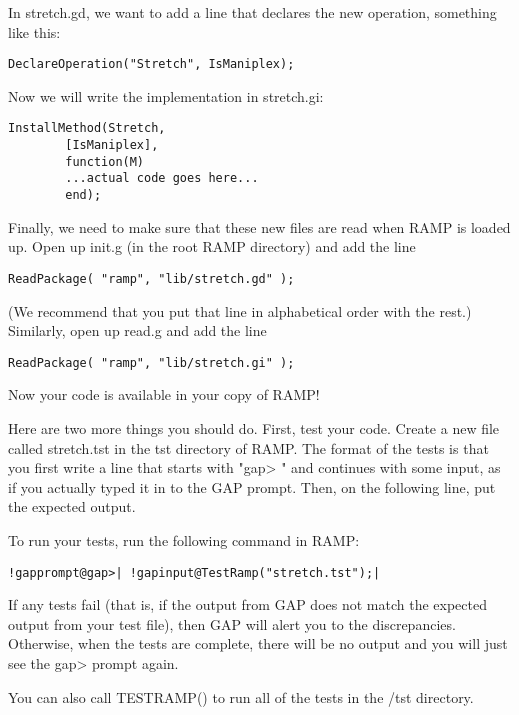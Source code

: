 \documentclass[a4paper,11pt]{report}
\begin{document}
{{ In stretch.gd, we want to add a line that declares the new operation,
something like this: 
\begin{Verbatim}[commandchars=!@|,fontsize=\small,frame=single,label=Example]
  DeclareOperation("Stretch", IsManiplex);
\end{Verbatim}
 Now we will write the implementation in stretch.gi: 
\begin{Verbatim}[commandchars=!@|,fontsize=\small,frame=single,label=Example]
  InstallMethod(Stretch, 
  		[IsManiplex],
  		function(M)
  		...actual code goes here...
  		end);
\end{Verbatim}
 Finally, we need to make sure that these new files are read when RAMP is
loaded up. Open up init.g (in the root RAMP directory) and add the line 
\begin{Verbatim}[commandchars=!@|,fontsize=\small,frame=single,label=Example]
  ReadPackage( "ramp", "lib/stretch.gd" ); 
\end{Verbatim}
 (We recommend that you put that line in alphabetical order with the rest.)
Similarly, open up read.g and add the line 
\begin{Verbatim}[commandchars=!@|,fontsize=\small,frame=single,label=Example]
  ReadPackage( "ramp", "lib/stretch.gi" ); 
\end{Verbatim}
 Now your code is available in your copy of RAMP! 

 Here are two more things you should do. First, test your code. Create a new
file called stretch.tst in the tst directory of RAMP. The format of the tests
is that you first write a line that starts with "gap{\textgreater} " and
continues with some input, as if you actually typed it in to the GAP prompt.
Then, on the following line, put the expected output. 

 To run your tests, run the following command in RAMP: 
\begin{Verbatim}[commandchars=!@|,fontsize=\small,frame=single,label=Example]
  !gapprompt@gap>| !gapinput@TestRamp("stretch.tst");|
\end{Verbatim}
 If any tests fail (that is, if the output from GAP does not match the expected
output from your test file), then GAP will alert you to the discrepancies.
Otherwise, when the tests are complete, there will be no output and you will
just see the gap{\textgreater} prompt again. 

 You can also call TEST{\textunderscore}RAMP() to run all of the tests in the
/tst directory. 

}}
\end{document}

